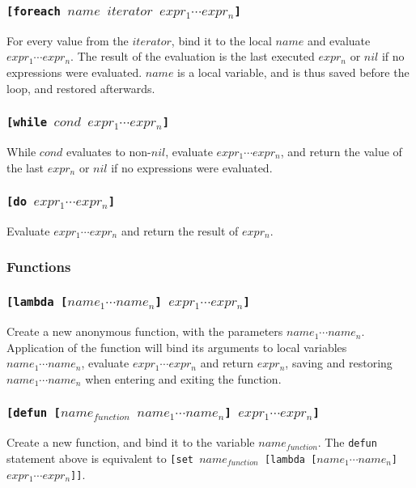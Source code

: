 \documentclass[11pt]{report}
\begin{document}
\subsubsection*{\tt{[foreach }$name$ $iterator$ $expr_1 \cdots expr_n$\tt{]}}
For every value from the $iterator$, bind it to the local $name$ and evaluate $expr_1 \cdots expr_n$. The result of the evaluation is the last executed $expr_n$ or $nil$ if no expressions were evaluated. $name$ is a local variable, and is thus saved before the loop, and restored afterwards.

\subsubsection*{\tt{[while }$cond$ $expr_1 \cdots expr_n$\tt{]}}
While $cond$ evaluates to non-$nil$, evaluate $expr_1 \cdots expr_n$, and return the value of the last $expr_n$ or $nil$ if no expressions were evaluated.


\subsubsection*{\tt{[do }$expr_1 \cdots expr_n$\tt{]}}
Evaluate $expr_1 \cdots expr_n$ and return the result of $expr_n$.


\subsubsection{Functions}
\subsubsection*{\tt{[lambda [}$name_1 \cdots name_n$\tt{]} $expr_1 \cdots expr_n$\tt{]}}
Create a new anonymous function, with the parameters $name_1\cdots name_n$. Application of the function will bind its arguments to local variables $name_1\cdots name_n$, evaluate $expr_1\cdots expr_n$ and return $expr_n$, saving and restoring $name_1\cdots name_n$ when entering and exiting the function.

\subsubsection*{\tt{[defun [}$name_{function}$ $name_1 \cdots name_n$\tt{]} $expr_1 \cdots expr_n$\tt{]}}
Create a new function, and bind it to the variable $name_{function}$. The \verb|defun| statement above is equivalent to {\tt{[set }}$name_{function}${\tt{ [lambda [}}$name_1 \cdots name_n${\tt{]}} $expr_1 \cdots expr_n${\tt{]]}}.
\end{document}
